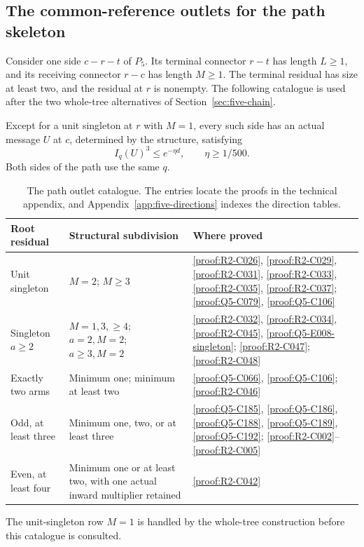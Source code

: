 \subsection{The common-reference outlets for the path skeleton}
Consider one side $c-r-t$ of $P_5$. Its terminal connector $r-t$ has
length $L\ge1$, and its receiving connector $r-c$ has length $M\ge1$.
The terminal residual has size at least two, and the
residual at $r$ is nonempty. The following catalogue is used after the two
whole-tree alternatives of Section~\ref{sec:five-chain}.
\begin{proposition}\label{prop:five-outlet}
Except for a unit singleton at $r$ with $M=1$, every such side has an
actual message $U$ at $c$, determined by the structure, satisfying
\begin{equation}\label{eq:five-outlet}
 I_q(U)^3\le e^{-\eta d},\qquad \eta\ge1/500.
\end{equation}
Both sides of the path use the same $q$.
\end{proposition}
\begin{table}[htbp]\centering\small
\caption{The path outlet catalogue. The entries locate the proofs in the technical appendix, and Appendix~\ref{app:five-directions} indexes the direction tables.}\label{tab:five-outlets}
\begin{tabular}{@{}p{38mm}p{54mm}p{50mm}@{}}\toprule
Root residual & Structural subdivision & Where proved\\\midrule
Unit singleton & $M=2$; $M\ge3$ &
\ref{proof:R2-C026}, \ref{proof:R2-C029}, \ref{proof:R2-C031},
\ref{proof:R2-C033}, \ref{proof:R2-C035}, \ref{proof:R2-C037};
\ref{proof:Q5-C079}, \ref{proof:Q5-C106}\\
Singleton $a\ge2$ & $M=1,3,\ge4$; $a=2,M=2$; $a\ge3,M=2$ &
\ref{proof:R2-C032}, \ref{proof:R2-C034}, \ref{proof:R2-C045},
\ref{proof:Q5-E008-singleton}; \ref{proof:R2-C047}; \ref{proof:R2-C048}\\
Exactly two arms & Minimum one; minimum at least two &
\ref{proof:Q5-C066}, \ref{proof:Q5-C106}; \ref{proof:R2-C046}\\
Odd, at least three & Minimum one, two, or at least three &
\ref{proof:Q5-C185}, \ref{proof:Q5-C186}, \ref{proof:Q5-C188},
\ref{proof:Q5-C189}, \ref{proof:Q5-C192};
\ref{proof:R2-C002}--\ref{proof:R2-C005}\\
Even, at least four & Minimum one or at least two, with one actual inward multiplier retained &
\ref{proof:R2-C042}\\\bottomrule
\end{tabular}
\end{table}
The unit-singleton row $M=1$ is handled by the whole-tree construction
before this catalogue is consulted.
